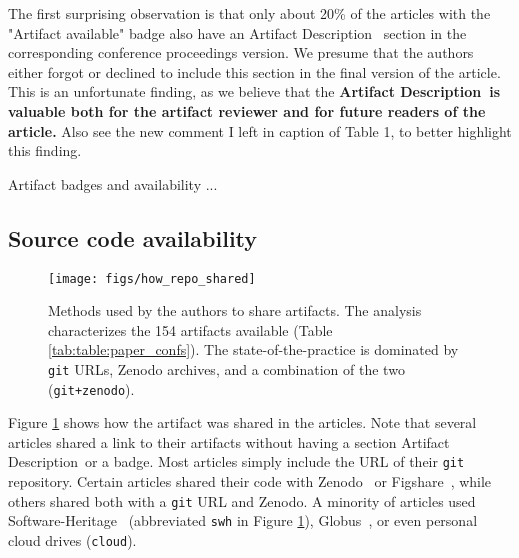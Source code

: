 \documentclass[sigconf,natbib=false]{acmart}
\newcommand{\ad}{Artifact Description}
\newcommand{\todo}[1]{{\color{red}{TODO: #1}}}
\newcommand{\fmc}[1]{{\color{magenta} #1}} %
\begin{document}
The first surprising observation is that only about 20\% of the articles with the "Artifact available" badge also have an \ad~ section in the corresponding conference proceedings version.
We presume that the authors either forgot or declined to include this section in the final version of the article.
This is an unfortunate finding, as we believe that the \textbf{\ad\ is valuable both for the artifact reviewer and for future readers of the article.} 
\fmc{Also see the new comment I left in caption of Table 1, to better highlight this finding. }

\begin{lesson}{Artifact badges and availability}{}
...
\end{lesson}



\subsection{Source code availability}\label{sec:sop:src}

\begin{figure}
  \centering 
  \texttt{[image: figs/how\_repo\_shared]}
  \caption{Methods used by the authors to share artifacts. 
  The analysis characterizes the 154 artifacts available (Table \ref{tab:table:paper_confs}).
  The state-of-the-practice is dominated by \texttt{git} URLs, Zenodo archives, and a combination of the two (\texttt{git+zenodo}).
  }
  \label{fig:how_repo_shared}
\end{figure}

Figure \ref{fig:how_repo_shared} shows how the artifact was shared in the articles.
Note that several articles shared a link to their artifacts without having a section \ad\ or a badge.
Most articles simply include the URL of their \texttt{git} repository.
Certain articles shared their code with Zenodo\ \cite{zenodo} or Figshare\ \cite{figshare}, while others shared both with a \texttt{git} URL and Zenodo.
A minority of articles used Software-Heritage\ \cite{swheritage} (abbreviated \texttt{swh} in Figure \ref{fig:how_repo_shared}), Globus\ \cite{globus}, or even personal cloud drives (\texttt{cloud}).
\end{document}
